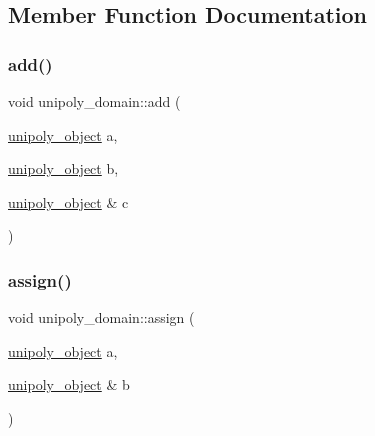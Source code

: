 \subsection{Member Function Documentation}
\mbox{\label{classunipoly__domain_a1a4ab101236d04a54cb0f83a34658976}} 
\subsubsection{\texorpdfstring{add()}{add()}}
{\footnotesize\ttfamily void unipoly\+\_\+domain\+::add (\begin{DoxyParamCaption}\item[{\mbox{\hyperlink{galois_8h_a77ca58de3d2da6172242493dd9c8aaa8}{unipoly\+\_\+object}}}]{a,  }\item[{\mbox{\hyperlink{galois_8h_a77ca58de3d2da6172242493dd9c8aaa8}{unipoly\+\_\+object}}}]{b,  }\item[{\mbox{\hyperlink{galois_8h_a77ca58de3d2da6172242493dd9c8aaa8}{unipoly\+\_\+object}} \&}]{c }\end{DoxyParamCaption})}

\mbox{\label{classunipoly__domain_a4742bf0f85fee30ab35fbc1188c39c1d}} 
\subsubsection{\texorpdfstring{assign()}{assign()}}
{\footnotesize\ttfamily void unipoly\+\_\+domain\+::assign (\begin{DoxyParamCaption}\item[{\mbox{\hyperlink{galois_8h_a77ca58de3d2da6172242493dd9c8aaa8}{unipoly\+\_\+object}}}]{a,  }\item[{\mbox{\hyperlink{galois_8h_a77ca58de3d2da6172242493dd9c8aaa8}{unipoly\+\_\+object}} \&}]{b }\end{DoxyParamCaption})}

\mbox{\label{classunipoly__domain_a929b37ab7417da08f5647759e9032941}} 
